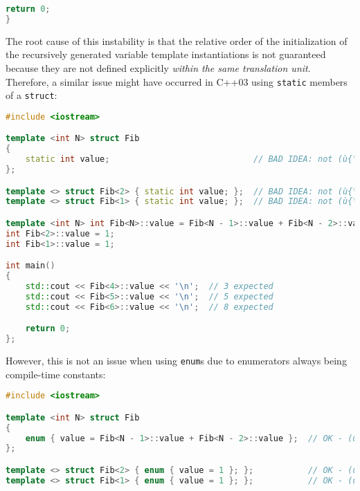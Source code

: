 {\begin{lstlisting}[language=C++]
    return 0;
}
\end{lstlisting}

\noindent The root cause of this instability is
that the relative order of the initialization of the recursively generated variable template instantiations
is not guaranteed because they are not defined explicitly \emph{within the same translation
unit}.  Therefore, a similar issue might have occurred in C++03 using \lstinline!static! members of a \lstinline!struct!:

\begin{lstlisting}[language=C++]
#include <iostream>

template <int N> struct Fib
{
    static int value;                             // BAD IDEA: not (ù{\codeincomments{const}}ù)
};

template <> struct Fib<2> { static int value; };  // BAD IDEA: not (ù{\codeincomments{const}}ù)
template <> struct Fib<1> { static int value; };  // BAD IDEA: not (ù{\codeincomments{const}}ù)

template <int N> int Fib<N>::value = Fib<N - 1>::value + Fib<N - 2>::value;
int Fib<2>::value = 1;
int Fib<1>::value = 1;

int main()
{
    std::cout << Fib<4>::value << '\n';  // 3 expected
    std::cout << Fib<5>::value << '\n';  // 5 expected
    std::cout << Fib<6>::value << '\n';  // 8 expected

    return 0;
};
\end{lstlisting}

\noindent However, this is not an issue when using \lstinline!enum!s due to enumerators always being compile-time constants:

\begin{lstlisting}[language=C++]
#include <iostream>

template <int N> struct Fib
{
    enum { value = Fib<N - 1>::value + Fib<N - 2>::value };  // OK - (ù{\codeincomments{const}}ù)
};

template <> struct Fib<2> { enum { value = 1 }; };           // OK - (ù{\codeincomments{const}}ù)
template <> struct Fib<1> { enum { value = 1 }; };           // OK - (ù{\codeincomments{const}}ù)


\end{lstlisting}}
